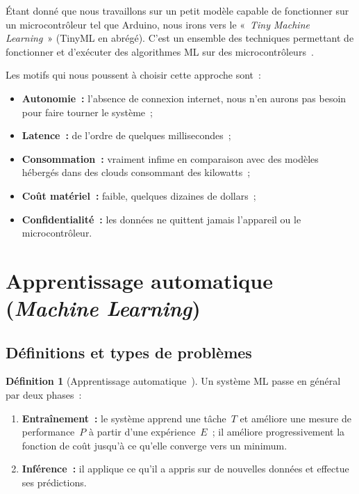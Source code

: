 \documentclass[a4paper,12pt,twoside]{report}
\theoremstyle{definition}
\newtheorem{defi}{Définition}
\theoremstyle{plain}
\theoremstyle{remark}
\begin{document}
Étant donné que nous travaillons sur un petit modèle capable de fonctionner sur un
microcontrôleur tel que Arduino, nous irons vers le «~\textit{Tiny Machine Learning}~»
(\ac{TinyML} en abrégé). C'est un ensemble des techniques permettant de fonctionner et
d'exécuter des algorithmes ML sur des microcontrôleurs~\cite{warden2019tinyml}.

Les motifs qui nous poussent à choisir cette approche sont~:
\begin{itemize}
	\item \textbf{Autonomie~:} l'absence de connexion internet, nous n'en aurons pas
	      besoin pour faire tourner le système~;
	\item \textbf{Latence~:} de l'ordre de quelques millisecondes~;
	\item \textbf{Consommation~:} vraiment infime en comparaison avec des modèles hébergés
	      dans des clouds consommant des kilowatts~;
	\item \textbf{Coût matériel~:} faible, quelques dizaines de dollars~;
	\item \textbf{Confidentialité~:} les données ne quittent jamais l'appareil ou le
	      microcontrôleur.
\end{itemize}

\section{Apprentissage automatique (\textit{Machine Learning})}
\label{sec:ml}

\subsection{Définitions et types de problèmes}
\label{subsec:types}

\begin{defi}[Apprentissage automatique~{\cite[p.~2]{mitchell1997}}]
Un système ML passe en général par deux phases~:
\begin{enumerate}
	\item \textbf{Entraînement~:} le système apprend une tâche~$T$ et améliore une mesure
	      de performance~$P$ à partir d'une expérience~$E$~; il améliore progressivement
	      la fonction de coût jusqu'à ce qu'elle converge vers un minimum.
	\item \textbf{Inférence~:} il applique ce qu'il a appris sur de nouvelles données et
	      effectue ses prédictions.
\end{enumerate}
\end{defi}
\end{document}
